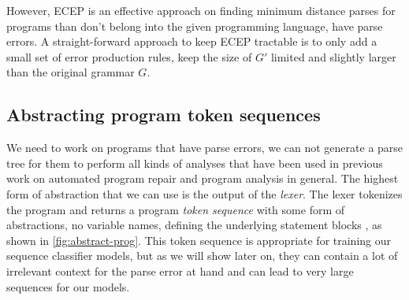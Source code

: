 However, ECEP is an effective approach on finding minimum distance parses for
programs than don't belong into the given programming language, \ie have parse
errors. A straight-forward approach to keep ECEP tractable is to only add a
small set of error production rules, \ie keep the size of $G'$ limited and
slightly larger than the original grammar $G$.







\subsection{Abstracting program token sequences}
\label{sec:overview:abstraction}

We need to work on programs that have parse errors, \ie we can not generate a
parse tree for them to perform all kinds of analyses that have been used in
previous work on automated program repair \citep{Sakkas_2020,
Martinez_2013,Gulwani_2018, Wang_2018} and program analysis in general.
%
The highest form of abstraction that we can use is the output of the
\emph{lexer}. The lexer tokenizes the program and returns a program \emph{token
sequence} with some form of abstractions, \eg no variable names, defining the
underlying statement blocks \etc, as shown in \autoref{fig:abstract-prog}.
This token sequence is appropriate for training our sequence classifier models,
but as we will show later on, they can contain a lot of irrelevant context for
the parse error at hand and can lead to very large sequences for our models.

